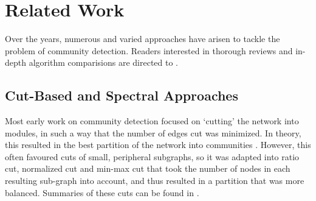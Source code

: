 \documentclass{report}
\begin{document}
	\section{Related Work}
	Over the years, numerous and varied approaches have arisen to tackle the problem of community detection. 
	Readers interested in thorough reviews and in-depth algorithm comparisions are directed to  \cite{fortunato2010community}.
	
	\subsection{Cut-Based and Spectral Approaches}
	Most early work on community detection focused on `cutting' the network into modules, in such a way that the number of edges cut was minimized. 
	In theory, this resulted in the best partition of the network into communities \cite{kernighan1970efficient}.
	However, this often favoured cuts of small, peripheral subgraphs, so it was adapted into ratio cut, normalized cut and min-max cut that took the number of nodes in each resulting sub-graph into account, and thus resulted in a partition that was more balanced.
	Summaries of these cuts can be found in \cite{fortunato2010community}.
	
	
\end{document}
